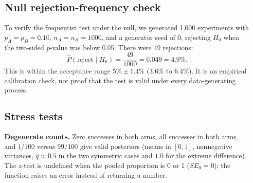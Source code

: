 \documentclass[11pt]{article}
\begin{document}
\subsection{Null rejection-frequency check}
To verify the frequentist test under the null, we generated 1,000 experiments with $p_A=p_B=0.10$, $n_A=n_B=1000$, and a generator seed of 0, rejecting $H_0$ when the two-sided $p$-value was below 0.05. There were 49 rejections:
\[
\widehat{P}(\mathrm{reject}\mid H_0)=\frac{49}{1000}=\boxed{0.049=4.9\%}.
\]
This is within the acceptance range $5\%\pm1.4\%$ ($3.6\%$ to $6.4\%$). It is an empirical calibration check, not proof that the test is valid under every data-generating process.

\subsection{Stress tests}
\textbf{Degenerate counts.} Zero successes in both arms, all successes in both arms, and $1/100$ versus $99/100$ give valid posteriors (means in $[0,1]$, nonnegative variances, $\hat q\approx0.5$ in the two symmetric cases and $1.0$ for the extreme difference). The $z$-test is undefined when the pooled proportion is 0 or 1 ($SE_0=0$); the function raises an error instead of returning a number.
\end{document}
